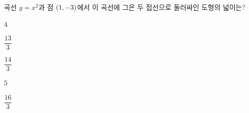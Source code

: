 곡선 $y=x^2$과 점 $(1{,}\mkern3mu\mathopen{}-3)$에서 이 곡선에 그은 두 접선으로 둘러싸인 도형의 넓이는?
\begin{choices32}{\rule[-3ex]{0pt}{8ex}$4$}{\rule[-3ex]{0pt}{8ex}$\dfrac{13}{3}$}{\rule[-3ex]{0pt}{8ex}$\dfrac{14}{3}$}{\rule[-3ex]{0pt}{8ex}$5$}{\rule[-3ex]{0pt}{8ex}$\dfrac{16}{3}$}\end{choices32}

